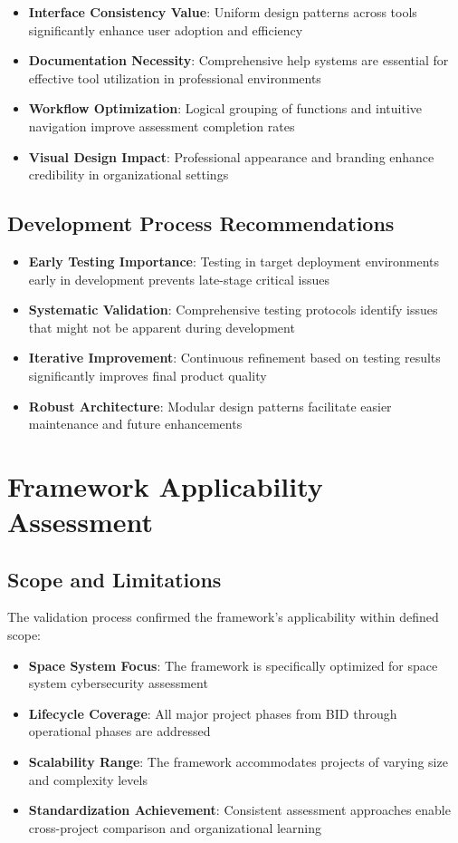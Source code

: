 \documentclass[binding=0.6cm]{sapthesis}
\begin{document}
\begin{itemize}
    \item \textbf{Interface Consistency Value}: Uniform design patterns across tools significantly enhance user adoption and efficiency
    \item \textbf{Documentation Necessity}: Comprehensive help systems are essential for effective tool utilization in professional environments
    \item \textbf{Workflow Optimization}: Logical grouping of functions and intuitive navigation improve assessment completion rates
    \item \textbf{Visual Design Impact}: Professional appearance and branding enhance credibility in organizational settings
\end{itemize}

\subsection{Development Process Recommendations}

\begin{itemize}
    \item \textbf{Early Testing Importance}: Testing in target deployment environments early in development prevents late-stage critical issues
    \item \textbf{Systematic Validation}: Comprehensive testing protocols identify issues that might not be apparent during development
    \item \textbf{Iterative Improvement}: Continuous refinement based on testing results significantly improves final product quality
    \item \textbf{Robust Architecture}: Modular design patterns facilitate easier maintenance and future enhancements
\end{itemize}

\section{Framework Applicability Assessment}

\subsection{Scope and Limitations}

The validation process confirmed the framework's applicability within defined scope:

\begin{itemize}
    \item \textbf{Space System Focus}: The framework is specifically optimized for space system cybersecurity assessment
    \item \textbf{Lifecycle Coverage}: All major project phases from BID through operational phases are addressed
    \item \textbf{Scalability Range}: The framework accommodates projects of varying size and complexity levels
    \item \textbf{Standardization Achievement}: Consistent assessment approaches enable cross-project comparison and organizational learning
\end{itemize}
\end{document}
